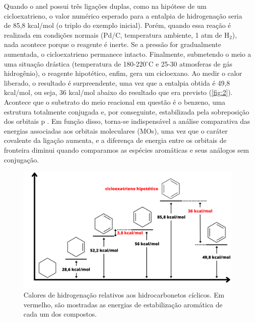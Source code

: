 Quando o anel possui três ligações duplas, como na hipótese de um cicloexatrieno, o valor numérico esperado para a entalpia de hidrogenação seria de 85,8 kcal/mol (o triplo do exemplo inicial). Porém, quando essa reação é realizada em condições normais (Pd/C, temperatura ambiente, 1 atm de H$_2$), nada acontece porque o reagente é inerte. Se a pressão for gradualmente aumentada, o cicloexatrieno permanece intacto. Finalmente, submetendo o meio a uma situação drástica (temperatura de 180-220$^\circ$C e 25-30 atmosferas de gás hidrogênio), o reagente hipotético, enfim, gera um cicloexano. Ao medir o calor liberado, o resultado é surpreendente, uma vez que a entalpia obtida é 49,8 kcal/mol, ou seja, 36 kcal/mol abaixo do resultado que era previsto (\autoref{fig:2}). Acontece que o substrato do meio reacional em questão é o benzeno, uma estrutura totalmente conjugada e, por conseguinte, estabilizada pela sobreposição dos orbitais p \autocite{Shaabani2008, Xu2021}. Em função disso, torna-se indispensável a análise comparativa das energias associadas aos orbitais moleculares (\gls{MOs}), uma vez que o caráter covalente da ligação aumenta, e a diferença de energia entre os orbitais de fronteira diminui quando comparamos as espécies aromáticas e seus análogos sem conjugação.


\begin{figure}[htb]
	\caption{\label{fig:2} Calores de hidrogenação relativos aos hidrocarbonetos cíclicos. Em vermelho, são mostradas as energias de estabilização aromática de cada um dos compostos.}
	\begin{center}
		\includegraphics[width=1.0\textwidth]{images/fig2.png}
	\end{center}
\end{figure}


